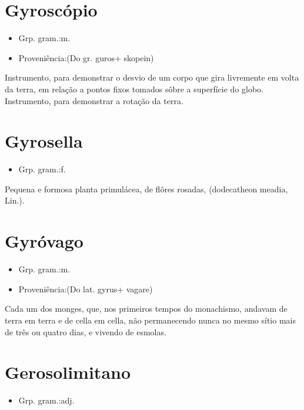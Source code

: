 \section{Gyroscópio}
\begin{itemize}
\item {Grp. gram.:m.}
\end{itemize}
\begin{itemize}
\item {Proveniência:(Do gr. \textunderscore guros\textunderscore  + \textunderscore skopein\textunderscore )}
\end{itemize}
Instrumento, para demonstrar o desvio de um corpo que gira livremente em volta da terra, em relação a pontos fixos tomados sôbre a superfície do globo.
Instrumento, para demonstrar a rotação da terra.
\section{Gyrosella}
\begin{itemize}
\item {Grp. gram.:f.}
\end{itemize}
Pequena e formosa planta primulácea, de flôres rosadas, (\textunderscore dodecatheon meadia\textunderscore , Lin.).
\section{Gyróvago}
\begin{itemize}
\item {Grp. gram.:m.}
\end{itemize}
\begin{itemize}
\item {Proveniência:(Do lat. \textunderscore gyrus\textunderscore  + \textunderscore vagare\textunderscore )}
\end{itemize}
Cada um dos monges, que, nos primeiros tempos do monachismo, andavam de terra em terra e de cella em cella, não permanecendo nunca no mesmo sítio mais de três ou quatro dias, e vivendo de esmolas.
\section{Gerosolimitano}
\begin{itemize}
\item {Grp. gram.:adj.}
\end{itemize}
